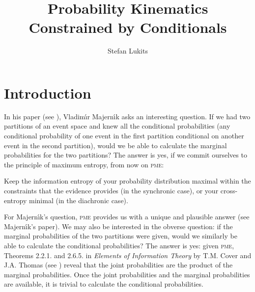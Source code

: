 \documentclass[11pt]{article}
\begin{document}


\title{Probability Kinematics Constrained by Conditionals}
\author{Stefan Lukits}
\date{}
\doublespacing



\section{Introduction}
\label{Introduction}

In his paper  (see ),
Vladim{\'\i}r Majern{\'\i}k asks an interesting question. If we had
two partitions of an event space and knew all the conditional
probabilities (any conditional probability of one event in the first
partition conditional on another event in the second partition), would
we be able to calculate the marginal probabilities for the two
partitions? The answer is yes, if we commit ourselves to the principle
of maximum entropy, from now on \textsc{pme}:

\begin{quotex}
   Keep the information entropy of your probability
  distribution maximal within the constraints that the evidence
  provides (in the synchronic case), or your cross-entropy minimal (in
  the diachronic case).
\end{quotex}

For Majern{\'\i}k's question, \textsc{pme} provides us with a unique and
plausible answer (see Majern{\'\i}k's paper). We may also be interested in
the obverse question: if the marginal probabilities of the two
partitions were given, would we similarly be able to calculate the
conditional probabilities? The answer is yes: given \textsc{pme},
Theorems 2.2.1. and 2.6.5. in \emph{Elements of Information Theory} by
T.M. Cover and J.A. Thomas (see ) reveal
that the joint probabilities are the product of the marginal
probabilities. Once the joint probabilities and the marginal
probabilities are available, it is trivial to calculate the
conditional probabilities.
\end{document}
